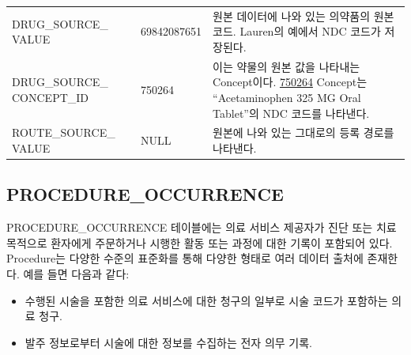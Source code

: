 \documentclass[11pt]{book}
\providecommand{\tightlist}{%
  \setlength{\itemsep}{0pt}\setlength{\parskip}{0pt}}
\theoremstyle{definition}
\theoremstyle{definition}
\theoremstyle{definition}
\theoremstyle{remark}
\begin{document}
\begin{longtable}[]{@{}lll@{}}
\begin{minipage}[t]{0.28\columnwidth}\raggedright\strut
DRUG\_SOURCE\_ VALUE\strut
\end{minipage} & \begin{minipage}[t]{0.16\columnwidth}\raggedright\strut
69842087651\strut
\end{minipage} & \begin{minipage}[t]{0.48\columnwidth}\raggedright\strut
원본 데이터에 나와 있는 의약품의 원본 코드. Lauren의 예에서 NDC 코드가
저장된다.\strut
\end{minipage}\tabularnewline
\begin{minipage}[t]{0.28\columnwidth}\raggedright\strut
DRUG\_SOURCE\_ CONCEPT\_ID\strut
\end{minipage} & \begin{minipage}[t]{0.16\columnwidth}\raggedright\strut
750264\strut
\end{minipage} & \begin{minipage}[t]{0.48\columnwidth}\raggedright\strut
이는 약물의 원본 값을 나타내는 Concept이다.
\href{http://athena.ohdsi.org/search-terms/terms/750264}{750264}
Concept는 ``Acetaminophen 325 MG Oral Tablet''의 NDC 코드를
나타낸다.\strut
\end{minipage}\tabularnewline
\begin{minipage}[t]{0.28\columnwidth}\raggedright\strut
ROUTE\_SOURCE\_ VALUE\strut
\end{minipage} & \begin{minipage}[t]{0.16\columnwidth}\raggedright\strut
NULL\strut
\end{minipage} & \begin{minipage}[t]{0.48\columnwidth}\raggedright\strut
원본에 나와 있는 그대로의 등록 경로를 나타낸다.\strut
\end{minipage}\tabularnewline
\bottomrule
\end{longtable}

\subsection{PROCEDURE\_OCCURRENCE}\label{procedureOccurrence}

PROCEDURE\_OCCURRENCE 테이블에는 의료 서비스 제공자가 진단 또는 치료
목적으로 환자에게 주문하거나 시행한 활동 또는 과정에 대한 기록이
포함되어 있다. Procedure는 다양한 수준의 표준화를 통해 다양한 형태로
여러 데이터 출처에 존재한다. 예를 들면 다음과 같다:

\begin{itemize}
\tightlist
\item
  수행된 시술을 포함한 의료 서비스에 대한 청구의 일부로 시술 코드가
  포함하는 의료 청구.
\item
  발주 정보로부터 시술에 대한 정보를 수집하는 전자 의무 기록.
\end{itemize}
\end{document}
